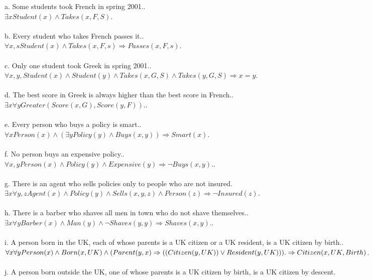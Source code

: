 \documentclass[a4paper]{article}
\begin{document}
\begin{enumerate}[1.]
a. Some students took French in spring 2001..\\
$\exists x Student(x) \wedge Takes(x, F, S)$.\\
\\
b. Every student who takes French passes it..\\
$\forall  x, s Student(x) \wedge Takes(x, F, s) \Rightarrow Passes(x, F, s)$.\\
\\
c. Only one student took Greek in spring 2001..\\
$\forall  x,y, Student(x) \wedge Student(y) \wedge Takes(x,G, S) \wedge Takes(y,G, S)  \Rightarrow x=y$.\\
\\
d. The best score in Greek is always higher than the best score in French..\\
$\exists x \forall y Greater(Score(x,G), Score(y,F))$..\\
\\
e. Every person who buys a policy is smart..\\
$\forall x Person(x) \wedge (\exists y Policy(y) \wedge Buys(x, y)) \Rightarrow Smart(x)$.\\
\\
f. No person buys an expensive policy..\\
$\forall  x, y Person(x) \wedge Policy(y) \wedge Expensive(y) \Rightarrow \neg Buys(x, y)$..\\
\\
g. There is an agent who sells policies only to people who are not insured.\\
$\exists x\forall y, z Agent(x) \wedge Policy(y) \wedge Sells(x, y, z) \wedge Person(z) \Rightarrow \neg Insured(z)$.\\
\\
h. There is a barber who shaves all men in town who do not shave themselves..\\
$\exists x \forall y Barber(x) \wedge Man(y) \wedge \neg Shaves(y, y) \Rightarrow Shaves(x, y)$..\\
\\
i. A person born in the UK, each of whose parents is a UK citizen or a UK resident, is a UK citizen by birth..\\
$\forall x\forall y Person(x) \wedge Born(x,UK) \wedge (Parent(y, x) \Rightarrow ((Citizen(y,UK)) \vee Resident(y,UK))).\\ \Rightarrow Citizen(x,UK,Birth)$.\\
\\
j. A person born outside the UK, one of whose parents is a UK citizen by birth, is a UK citizen by descent.\\

\end{enumerate}
\end{document}
